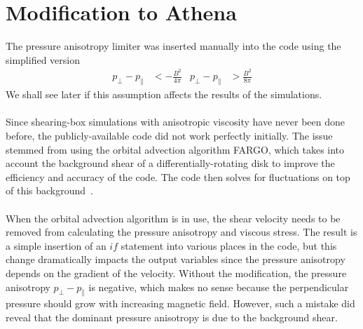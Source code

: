 \section{Modification to Athena} \label{sec:athenamod}
The pressure anisotropy limiter was inserted manually into the code using the simplified version
\begin{align*}
  p_\perp-p_\parallel&<-\frac{B^2}{4\pi} & p_\perp-p_\parallel&>\frac{B^2}{8\pi}
\end{align*}
We shall see later if this assumption affects the results of the simulations.\\
\\
Since shearing-box simulations with anisotropic viscosity have never been done before, the publicly-available code did not work perfectly initially. The issue stemmed from using the orbital advection algorithm FARGO, which takes into account the background shear of a differentially-rotating disk to improve the efficiency and accuracy of the code. The code then solves for fluctuations on top of this background~\cite{Stone2010}.\\
\\
When the orbital advection algorithm is in use, the shear velocity needs to be removed from calculating the pressure anisotropy and viscous stress. The result is a simple insertion of an $if$ statement into various places in the code, but this change dramatically impacts the output variables since the pressure anisotropy depends on the gradient of the velocity. Without the modification, the pressure anisotropy $p_\perp-p_\parallel$ is negative, which makes no sense because the perpendicular pressure should grow with increasing magnetic field. However, such a mistake did reveal that the dominant pressure anisotropy is due to the background shear.
